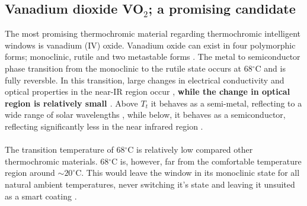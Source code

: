 \subsection{Vanadium dioxide VO$_2$; a promising candidate} \label{sec:vo2}
The most promising thermochromic material regarding thermochromic intelligent windows
is vanadium (IV) oxide.
%
Vanadium oxide can exist in four polymorphic forms; monoclinic, rutile and two 
metastable forms \cite{Leroux1998}. The metal to semiconductor phase transition from the 
monoclinic to the rutile state occurs at 68$^{\circ}$C and is fully reversble. %
In this transition, large changes in electrical conductivity and optical properties in the near-IR region 
occur \cite{Morin1959}, 
\textbf{while the change in optical region is relatively small \cite[p.~395]{Parkin2006}}. 
Above $T_t$ it behaves as a semi-metal, reflecting to a wide range of solar wavelengths
, while below, it behaves as a semiconductor, reflecting significantly less in the near infrared region 
\cite[p.~4565]{Blackman2009}.%
\\
\\
The transition temperature of 68$^{\circ}$C is relatively low compared other thermochromic materials.
68$^{\circ}$C is, however, far from the comfortable temperature region around $\sim 20^{\circ}$C.
This would leave the window in its monoclinic state for all natural ambient temperatures, 
never switching it's state and leaving it unsuited as a smart coating
\cite[p.~358]{Kamalisarvestani2013} \cite[p.~39]{Kanu2010}.
%

